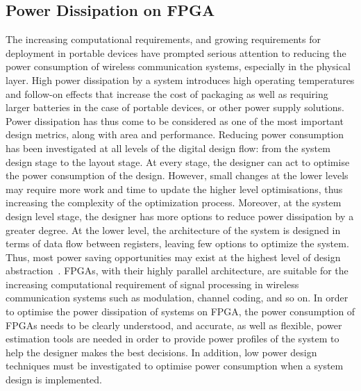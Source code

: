 \subsection{Power Dissipation on FPGA}
The increasing computational requirements, and growing requirements for deployment in portable devices have prompted serious attention to reducing the power consumption of wireless communication systems, especially in the physical layer.
High power dissipation by a system introduces high operating temperatures and follow-on effects that increase the cost of packaging as well as requiring larger batteries in the case of portable devices, or other power supply solutions.
Power dissipation has thus come to be considered as one of the most important design metrics, along with area and performance.
Reducing power consumption has been investigated at all levels of the digital design flow: from the system design stage to the layout stage.
At every stage, the designer can act to optimise the power consumption of the design.
However, small changes at the lower levels may require more work and time to update the higher level optimisations, thus increasing the complexity of the optimization process.
Moreover, at the system design level stage, the designer has more options to reduce power dissipation by a greater degree.
At the lower level, the architecture of the system is designed in terms of data flow between registers, leaving few options to optimize the system.
Thus, most power saving opportunities may exist at the highest level of design abstraction~\cite{Raghunathan1998}.
FPGAs, with their highly parallel architecture, are suitable for the increasing computational requirement of signal processing in wireless communication systems such as modulation, channel coding, and so on.
In order to optimise the power dissipation of systems on FPGA, the power consumption of FPGAs needs to be clearly understood, and accurate, as well as flexible, power estimation tools are needed in order to provide power profiles of the system to help the designer makes the best decisions.
In addition, low power design techniques must be investigated to optimise power consumption when a system design is implemented.
%
